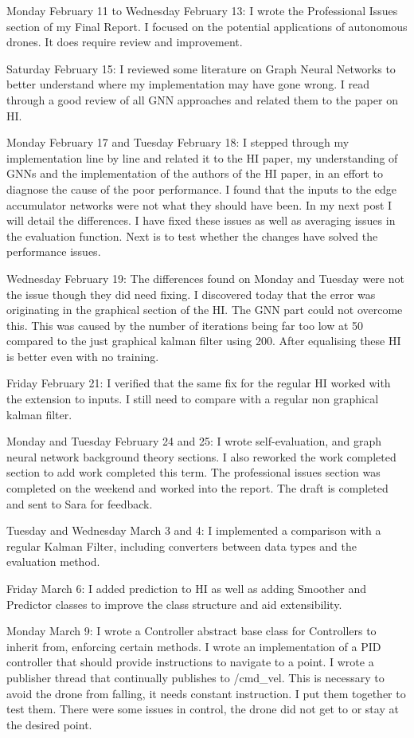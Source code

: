 \documentclass[]{../resources/final_report}
\begin{document}
\begin{appendices}
  Monday February 11 to Wednesday February 13: I wrote the Professional Issues section of my Final Report. I focused on the potential applications of autonomous drones. It does require review and improvement.

  Saturday February 15: I reviewed some literature on Graph Neural Networks to better understand where my implementation may have gone wrong. I read through a good review of all GNN approaches and related them to the paper on HI.

  Monday February 17 and Tuesday February 18: I stepped through my implementation line by line and related it to the HI paper, my understanding of GNNs and the implementation of the authors of the HI paper, in an effort to diagnose the cause of the poor performance. I found that the inputs to the edge accumulator networks were not what they should have been. In my next post I will detail the differences. I have fixed these issues as well as averaging issues in the evaluation function. Next is to test whether the changes have solved the performance issues.

  Wednesday February 19: The differences found on Monday and Tuesday were not the issue though they did need fixing. I discovered today that the error was originating in the graphical section of the HI. The GNN part could not overcome this. This was caused by the number of iterations being far too low at 50 compared to the just graphical kalman filter using 200. After equalising these HI is better even with no training.

  Friday February 21: I verified that the same fix for the regular HI worked with the extension to inputs. I still need to compare with a regular non graphical kalman filter.

  Monday and Tuesday February 24 and 25: I wrote self-evaluation, and graph neural network background theory sections. I also reworked the work completed section to add work completed this term. The professional issues section was completed on the weekend and worked into the report. The draft is completed and sent to Sara for feedback.

  Tuesday and Wednesday March 3 and 4: I implemented a comparison with a regular Kalman Filter, including converters between data types and the evaluation method.

  Friday March 6: I added prediction to HI as well as adding Smoother and Predictor classes to improve the class structure and aid extensibility.

  Monday March 9: I wrote a Controller abstract base class for Controllers to inherit from, enforcing certain methods. I wrote an implementation of a PID controller that should provide instructions to navigate to a point. I wrote a publisher thread that continually publishes to /cmd\_vel. This is necessary to avoid the drone from falling, it needs constant instruction. I put them together to test them. There were some issues in control, the drone did not get to or stay at the desired point.


\end{appendices}
\end{document}
